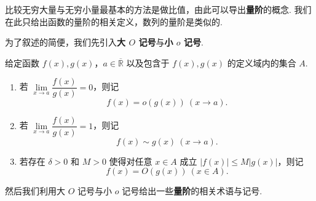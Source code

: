 \documentclass[../main.tex]{subfiles}
\begin{document}
比较无穷大量与无穷小量最基本的方法是做比值，由此可以导出\textbf{量阶}的概念. 我们在此只给出函数的量阶的相关定义，数列的量阶是类似的. 

为了叙述的简便，我们先引入\textbf{大 $O$ 记号}与\textbf{小 $o$ 记号}. 

\begin{definition} %
    给定函数 $f(x), g(x)$，$a \in \overline{\mathbb R}$ 以及包含于 $f(x), g(x)$ 的定义域内的集合 $A$. 
    \begin{enumerate}[label = (\arabic*)]
        \item 若 $\lim\limits_{x \to a} \dfrac{f(x)}{g(x)} = 0$，则记
        $$
        f(x) = o(g(x)) \ (x \to a). 
        $$
        \item 若 $\lim\limits_{x \to a} \dfrac{f(x)}{g(x)} = 1$，则记
        $$
        f(x) \sim g(x) \ (x \to a). 
        $$
        \item 若存在 $\delta > 0$ 和 $M > 0$ 使得对任意 $x \in A$ 成立 $|f(x)| \leqslant M |g(x)|$，则记 
        $$
        f(x) = O(g(x)) \ (x \in A). 
        $$
    \end{enumerate}
\end{definition}

然后我们利用大 $O$ 记号与小 $o$ 记号给出一些\textbf{量阶}的相关术语与记号. 
\end{document}
